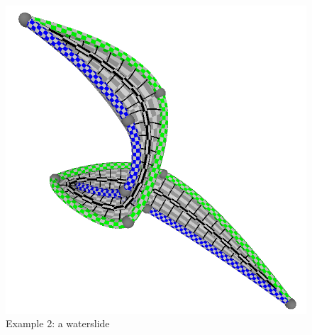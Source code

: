 \documentclass[journal, letterpaper]{IEEEtran}
\begin{document}
\begin{figure}
	\centering
		\includegraphics[scale=0.6]{images/Result3.png}
	\caption{Example 2: a waterslide}
	\label{fig:Result3}
\end{figure}
\end{document}
